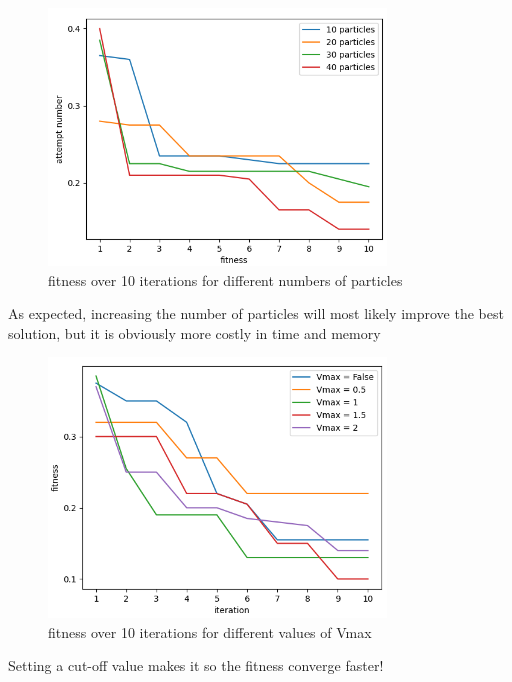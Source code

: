 \documentclass[a4paper]{article}
\begin{document}
\begin{figure}[H]
\center
\includegraphics[width=0.8\textwidth]{images/fit_over_particles.PNG}
\caption{fitness over 10 iterations for different numbers of particles}
\end{figure}
As expected, increasing the number of particles will most likely improve the best solution, but it is obviously more costly in time and memory

\begin{figure}[H]
\center
\includegraphics[width=0.8\textwidth]{images/v_max.PNG}
\caption{fitness over 10 iterations for different values of Vmax}
\end{figure}
Setting a cut-off value makes it so the fitness converge faster!
\end{document}
